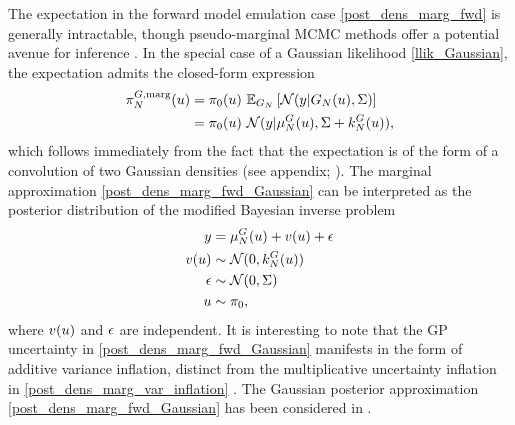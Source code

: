 \documentclass[12pt]{article}
\begin{document}
The expectation in the forward model emulation case 
\ref{post_dens_marg_fwd} is generally intractable, though pseudo-marginal MCMC methods offer a potential 
avenue for inference \cite{pseudoMarginalMCMC}. In the special case of a Gaussian likelihood \ref{llik_Gaussian}, 
the expectation admits the closed-form expression
\begin{align}
\fwdEmMargDens[\Ndesign](\Par) 
&= \priorDens(\Par) \ \E_{\fwdEm}\left[\Gaussian(\obs | \fwdEm[\Ndesign](\Par), \likPar) \right]
\nonumber \\
&= \priorDens(\Par) \ \Gaussian(\obs | \emMean[\Ndesign]{\fwd}(\Par), \likPar + \emKer[\Ndesign]{\fwd}(\Par)),
\label{post_dens_marg_fwd_Gaussian}
\end{align}
which follows immediately from the fact that the expectation is of the form of a convolution 
of two Gaussian densities (see appendix; \todo). The marginal approximation \ref{post_dens_marg_fwd_Gaussian}
can be interpreted as the posterior distribution of the modified Bayesian inverse problem 
\begin{align}
\obs &= \emMean[\Ndesign]{\fwd}(\Par) + v(\Par) + \noise \label{inv_prob_Gaussian_marginal_approx} \\
v(\Par) &\sim \Gaussian(0, \emKer[\Ndesign]{\fwd}(\Par)) \nonumber \\
\noise &\sim \Gaussian(0, \likPar) \nonumber \\
\Par &\sim \priorDens \nonumber, 
\end{align}
where $v(\Par)$ and $\noise$ are independent. It is interesting to note that the GP uncertainty in 
\ref{post_dens_marg_fwd_Gaussian} manifests in the form of additive variance inflation, distinct 
from the multiplicative uncertainty inflation in \ref{post_dens_marg_var_inflation} \cite{GP_PDE_priors}. 
The Gaussian posterior approximation \ref{post_dens_marg_fwd_Gaussian} has been considered in 
\cite{StuartTeck2, hydrologicalModel, GP_PDE_priors, GP_PDE_priors, CES, idealizedGCM, weightedIVAR}. 
\end{document}
